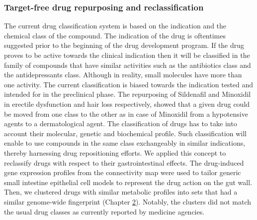 \subsubsection{Target-free drug repurposing and reclassification}
The current drug classification system is based on the indication and the chemical class of the compound. The indication of the drug is oftentimes suggested prior to the beginning of the drug development program. If the drug proves to be active towards the clinical indication then it will be classified in the family of compounds that have similar activities such as the antibiotics class and the antidepressants class. Although in reality, small molecules have more than one activity. The current classification is biased towards the indication tested and intended for in the preclinical phase. The repurposing of Sildenafil and Minoxidil in erectile dysfunction and hair loss respectively, showed that a given drug could be moved from one class to the other as in case of Minoxidil from a hypotensive agents to a dermatological agent. The classification of drugs has to take into account their molecular, genetic and biochemical profile. Such classification will enable to use compounds in the same class exchangeably in similar indications, thereby harnessing drug repositioning efforts. We applied this concept to reclassify drugs with respect to their gastrointestinal effects. The drug-induced gene expression profiles from the connectivity map \cite{subramanian2017next} were used to tailor generic small intestine epithelial cell models to represent the drug action on the gut wall. Then, we clustered drugs with similar metabolic profiles into sets that had a similar genome-wide fingerprint (Chapter \hyperref[ch:chapter2]{2}). Notably, the clusters did not match the usual drug classes as currently reported by medicine agencies.
